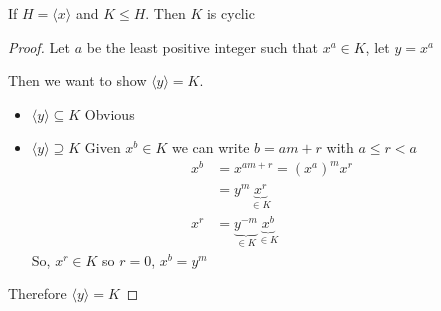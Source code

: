 \begin{theorem}
  If $H = \langle x \rangle$ and $K \leq H$. Then $K$ is cyclic 
\end{theorem}

\begin{proof}
  Let $a$ be the least positive integer such that $x^a \in K$, let $y = x^a$
  
  Then we want to show $\langle y \rangle = K$. 
  \begin{itemize}
    \item $\langle y \rangle \subseteq K$ Obvious
    \item $\langle y \rangle \supseteq K$ Given $x^b \in K$ we can write $b = am + r$ with $a \leq r < a$ 
    \begin{align*}
      x^b &= x^{am+r} = (x^a)^mx^r \\
    &= y^m \underbrace{x^r}_{\in K} \\
    x^r &= \underbrace{y^{-m}}_{\in K}\underbrace{x^b}_{\in K}
    \end{align*}
    So, $x^r \in K$ so $r = 0$, $x^b = y^m$
  \end{itemize}
  Therefore $\langle y \rangle = K$
\end{proof}
